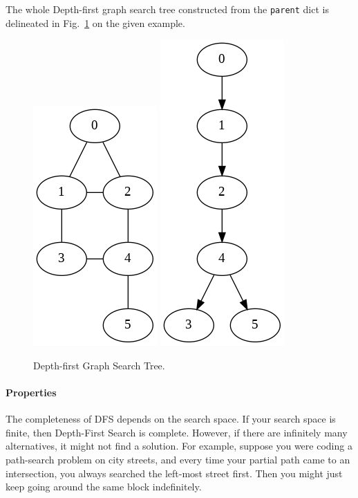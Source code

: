 \documentclass[../main.tex]{subfiles}
\begin{document}
The whole Depth-first graph search tree constructed from the \texttt{parent} dict is delineated in Fig.~\ref{fig:depth_first_graph_search_tree} on the given example.
\begin{figure}[!ht]
    \centering
    \includegraphics[width=0.3\columnwidth]{fig/undirected_cyclic_graph.png}
     \includegraphics[width=0.3\columnwidth]{fig/depth_first_graph_search_tree.png}
  
    \caption{Depth-first Graph Search Tree.}
    \label{fig:depth_first_graph_search_tree}
\end{figure}




\paragraph{Properties} The completeness of DFS depends on  the search space. If your search space is finite, then Depth-First Search is complete. However, if there are infinitely many alternatives, it might not find a solution. For example, suppose you were coding a path-search problem on city streets, and every time your partial path came to an intersection, you always searched the left-most street first. Then you might just keep going around the same block indefinitely.
\end{document}
